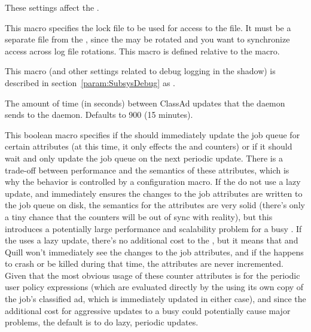 These settings affect the .
\begin{description}

\label{param:ShadowLock}
\item[\Macro{SHADOW\_LOCK}]
  This macro specifies the lock file to be used for access to the
   file.  It must be a separate file from the
  , since the  may be rotated 
  and you want to synchronize access across log file rotations.
  This macro is defined relative to the  macro.

\label{param:ShadowDebug}
\item[\Macro{SHADOW\_DEBUG}]
  This macro (and other settings related to debug logging in the shadow) is
  described in section~\ref{param:SubsysDebug} as
  .

\label{param:ShadowQueueUpdateInterval}
\item[\Macro{SHADOW\_QUEUE\_UPDATE\_INTERVAL}]
  The amount of time (in seconds) between ClassAd updates that the
   daemon sends to the  daemon.
  Defaults to 900 (15 minutes).

\label{param:ShadowLazyQueueUpdate}
\item[\Macro{SHADOW\_LAZY\_QUEUE\_UPDATE}]
  This boolean macro specifies if the  should
  immediately update the job queue for certain attributes (at this
  time, it only effects the  and
   counters) or if it should wait and only
  update the job queue on the next periodic update.
  There is a trade-off between performance and the semantics of these
  attributes, which is why the behavior is controlled by a
  configuration macro.
  If the  do not use a lazy update, and immediately
  ensures the changes to the job attributes are written to the job
  queue on disk, the semantics for the attributes are very solid
  (there's only a tiny chance that the counters will be out of sync
  with reality), but this introduces a potentially large performance
  and scalability problem for a busy .
  If the  uses a lazy update, there's no additional cost
  to the , but it means that  and Quill won't
  immediately see the changes to the job attributes, and if the
   happens to crash or be killed during that time, the
  attributes are never incremented.
  Given that the most obvious usage of these counter attributes is for
  the periodic user policy expressions (which are evaluated directly
  by the  using its own copy of the job's classified
  ad, which is immediately updated in either case), and since the
  additional cost for aggressive updates to a busy 
  could potentially cause major problems, the default is 
  to do lazy, periodic updates.


\end{description}
